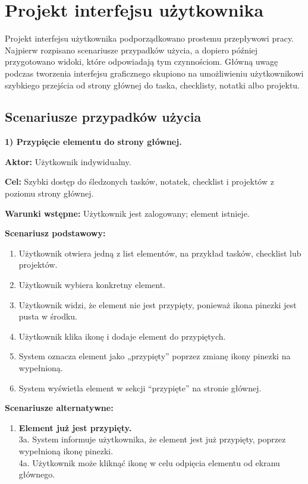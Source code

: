 \documentclass[12pt,a4paper,twoside]{report}
\newcommand{\FirstParagraph}{\noindent\ignorespaces}
\begin{document}
\chapter{Projekt interfejsu użytkownika}

\FirstParagraph Projekt interfejsu użytkownika podporządkowano prostemu przepływowi pracy. Najpierw rozpisano scenariusze przypadków użycia, a dopiero później przygotowano widoki, które odpowiadają tym czynnościom. Główną uwagę podczas tworzenia interfejsu graficznego skupiono na umożliwieniu użytkownikowi szybkiego przejścia od strony głównej do taska, checklisty, notatki albo projektu.

\section{Scenariusze przypadków użycia}

\FirstParagraph \noindent \textbf{1) Przypięcie elementu do strony głównej.}

\noindent \textbf{Aktor:} Użytkownik indywidualny.

\noindent \textbf{Cel:} Szybki dostęp do śledzonych tasków, notatek, checklist i projektów z poziomu strony głównej.

\noindent \textbf{Warunki wstępne:} Użytkownik jest zalogowany; element istnieje.

\noindent \textbf{Scenariusz podstawowy:}

\begin{enumerate}
\def\labelenumi{\arabic{enumi}.}
\item
  Użytkownik otwiera jedną z list elementów, na przykład tasków, checklist lub projektów.
\item
  Użytkownik wybiera konkretny element.
\item
  Użytkownik widzi, że element nie jest przypięty, ponieważ ikona pinezki jest pusta w środku.
\item
  Użytkownik klika ikonę i dodaje element do przypiętych.
\item
  System oznacza element jako „przypięty'' poprzez zmianę ikony pinezki na wypełnioną.
\item
  System wyświetla element w sekcji ``przypięte'' na stronie głównej.
\end{enumerate}

\noindent \textbf{Scenariusze alternatywne:}

\begin{enumerate}
\def\labelenumi{\arabic{enumi}.}
\item
  \textbf{Element już jest przypięty.}\\
  3a. System informuje użytkownika, że element jest już przypięty, poprzez wypełnioną ikonę pinezki.\\
  4a. Użytkownik może kliknąć ikonę w celu odpięcia elementu od ekranu głównego.
\end{enumerate}
\end{document}
